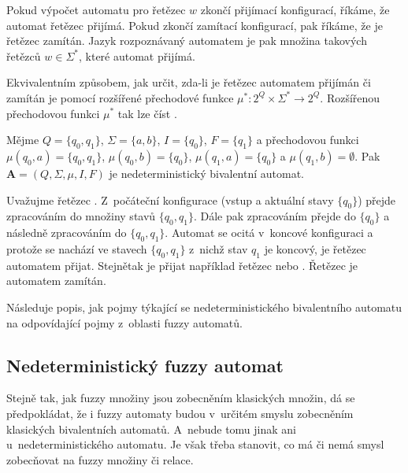 Pokud výpočet automatu pro řetězec $w$ zkončí přijímací konfigurací, říkáme, že automat řetězec přijímá. Pokud zkončí zamítací konfigurací, pak říkáme, že je řetězec zamítán. Jazyk rozpoznávaný automatem je pak množina takových řetězců $w \in \Sigma^*$, které automat přijímá.

Ekvivalentním způsobem, jak určit, zda-li je řetězec automatem přijímán či zamítán je pomocí rozšířené přechodové funkce $\mu^*: 2^Q \times \Sigma^* \rightarrow 2^Q$. Rozšířenou přechodovou funkci $\mu^*$ tak lze číst .

\begin{example}
 Mějme $Q = \{ q_0, q_1 \}$, $\Sigma = \{ a, b \}$, $I = \{ q_0 \}$, $F = \{ q_1 \}$ a přechodovou funkci $\mu(q_0, a) = \{ q_0, q_1 \}$, $\mu(q_0, b) = \{ q_0 \}$, $\mu(q_1, a) = \{ q_0 \}$ a $\mu(q_1, b) = \emptyset $. Pak $\mathbf{A} = (Q, \Sigma, \mu, I, F)$ je nedeterministický bivalentní automat.
 
 Uvažujme řetězec . Z~počáteční konfigurace (vstup  a aktuální stavy $\{ q_0 \}$) přejde zpracováním  do množiny stavů $\{ q_0, q_1 \}$. Dále pak zpracováním  přejde do $\{ q_0 \}$ a následně zpracováním  do $\{ q_0, q_1 \}$. Automat se ocitá v~koncové konfiguraci a protože se nachází ve stavech $\{ q_0, q_1 \}$ z~nichž stav $q_1$ je koncový, je řetězec  automatem přijat. Stejnětak je přijat například řetězec  nebo . Řetězec  je automatem zamítán.
\end{example}

Následuje popis, jak pojmy týkající se nedeterministického bivalentního automatu  na odpovídající pojmy z~oblasti fuzzy automatů. 

\subsection{Nedeterministický fuzzy automat}
Stejně tak, jak fuzzy množiny jsou zobecněním klasických  množin, dá se předpokládat, že i fuzzy automaty budou v~určitém smyslu zobecněním klasických bivalentních automatů. A~nebude tomu jinak ani u~nedeterministického automatu. Je však třeba stanovit, co má či nemá smysl zobecňovat na fuzzy množiny či relace.

